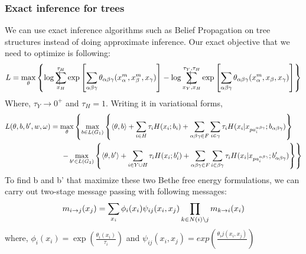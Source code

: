 \documentclass{article}
\makeatletter
\newcommand{\avsum}{\mathop{\mathpalette\avsuminner\relax}\displaylimits}
\newcommand\avsuminner[2]{%
  {\sbox0{$\m@th#1\sum$}%
   \vphantom{\usebox0}%
   \ooalign{%
     \hidewidth
     \smash{\vrule height\dimexpr\ht0+1pt\relax depth\dimexpr\dp0+1pt\relax}%
     \hidewidth\cr
     $\m@th#1\sum$\cr
   }%
  }%
}
\makeatother
\begin{document}
\subsubsection{Exact inference for trees}
We can use exact inference algorithms such as Belief Propagation on tree structures instead of doing approximate inference. Our exact objective that we need to optimize is following:
\begin{align*}
  L=\max_{\theta} \left\{ \log\avsum_{x_H}^{\tau_H}\exp\left [\sum_{\alpha\beta\gamma}\theta_{\alpha\beta\gamma}(x_{\alpha}^m,x_{\beta}^m,x_{\gamma})\right ] - \log\avsum_{x_Y,x_H}^{\tau_Y,\tau_H}\exp\left [\sum_{\alpha\beta\gamma}\theta_{\alpha\beta\gamma}(x_{\alpha}^m,x_{\beta},x_{\gamma})\right ] \right\}
\end{align*}
Where, $\tau_Y\rightarrow 0^+$ and $\tau_H=1$.
Writing it in variational forms,
\begin{align*}
L(\theta,b,b',w,\omega)&= \max_{\theta} \left\{\max_{b\in L(G_1)}  \left\{ \langle \theta,b \rangle+\sum_{i\in H}\tau_iH(x_i;b_i)+\sum_{\alpha\beta\gamma\in F}\sum_{i\in \gamma}\tau_iH(x_i|x_{pa_i^{\alpha\beta\gamma}};b_{\alpha\beta\gamma}) \right \} \right.\nonumber \\\label{dual}&\hspace{5mm}\left. - \max_{b'\in L(G_2)}  \left\{ \langle \theta,b' \rangle+\sum_{i\in Y\cup H}\tau_iH(x_i;b'_i)+\sum_{\alpha\beta\gamma\in F}\sum_{i\in \beta\gamma}\tau_iH(x_i|x_{pa_i^{\alpha\beta\gamma}};b'_{\alpha\beta\gamma})  \right\}\right\}
\end{align*}
To find b and b' that maximize these two Bethe free energy formulations, we can carry out two-stage message passing with following messages:
\begin{align*}
m_{i\rightarrow j}(x_j)&=\sum_{x_i}\phi_i(x_i)\psi_{ij}(x_i,x_j)\prod_{k\in N(i)\char`\\ j}m_{k\rightarrow i}(x_i)\\
\end{align*}
where, $\phi_i(x_i)=\exp(\frac{\theta_i(x_i)}{\tau_i})$ and $\psi_{ij}(x_i,x_j)=exp(\frac{\theta_ij(x_i,x_j)}{})$


\end{document}
